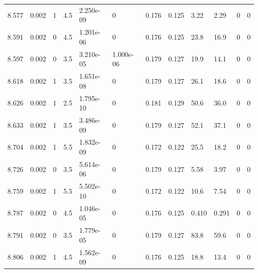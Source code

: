 \documentclass[preview]{standalone}
\begin{document}
{{{{{{{{\begin{tabular}{L{1.2cm}C{1.2cm} C{0.3cm}C{0.5cm} C{1.4cm}C{1.4cm} C{1.4cm}C{1.4cm} C{1.6cm}C{1.6cm} C{1.6cm}C{1.6cm}}
  8.577  &  0.002  & 1     & 4.5 &  2.250e-09  & 0  &  0.176&   0.125& 3.22 & 2.29   &  0 & 0  \\ 
  8.591  &  0.002  & 0     & 4.5 &  1.201e-06  & 0  &  0.176&   0.125& 23.8 & 16.9   &  0 & 0  \\ 
  8.597  &  0.002  & 0     & 3.5 &  3.210e-05  & 1.000e-06  &  0.179&   0.127& 19.9 & 14.1   &  0 & 0  \\ 
  8.618  &  0.002  & 1     & 3.5 &  1.651e-08  & 0  &  0.179&   0.127& 26.1 & 18.6   &  0 & 0  \\ 
  8.626  &  0.002  & 1     & 2.5 &  1.795e-10  & 0  &  0.181&   0.129& 50.6 & 36.0   &  0 & 0  \\ 
  8.633  &  0.002  & 1     & 3.5 &  3.486e-09  & 0  &  0.179&   0.127& 52.1 & 37.1   &  0 & 0  \\ 
  8.704  &  0.002  & 1     & 5.5 &  1.832e-09  & 0  &  0.172&   0.122& 25.5 & 18.2   &  0 & 0  \\ 
  8.726  &  0.002  & 0     & 3.5 &  5.614e-06  & 0  &  0.179&   0.127& 5.58 & 3.97   &  0 & 0  \\ 
  8.759  &  0.002  & 1     & 5.5 &  5.502e-10  & 0  &  0.172&   0.122& 10.6 & 7.54   &  0 & 0  \\ 
  8.787  &  0.002  & 0     & 4.5 &  1.046e-05  & 0  &  0.176&   0.125& 0.410 & 0.291   &  0 & 0  \\ 
  8.791  &  0.002  & 0     & 3.5 &  1.779e-05  & 0  &  0.179&   0.127& 83.8 & 59.6   &  0 & 0  \\ 
  8.806  &  0.002  & 1     & 4.5 &  1.562e-09  & 0  &  0.176&   0.125& 18.8 & 13.4   &  0 & 0  \\ 
\hline 
\end{tabular} 

}}}}}}}}
\end{document}
